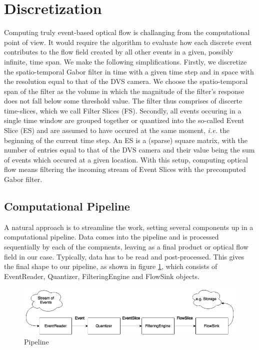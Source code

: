 \section{Discretization}

Computing truly event-based optical flow is challanging from the computational point of view. 
It would require the algorithm to evaluate how each discrete event contributes to the flow field created by all other events in a given, possibly infinite, time span.
We make the following simplifications.
Firstly, we discretize the spatio-temporal Gabor filter in time with a given time step and in space with the resolution equal to that of the DVS camera.
We choose the spatio-temporal span of the filter as the volume in which the magnitude of the filter's response does not fall below some threshold value.
The filter thus comprises of discerte time-slices, which we call Filter Slices (FS).
Secondly, all events occuring in a single time window are grouped together or quantized into the so-called Event Slice (ES) and are assumed to have occured at the same moment, \emph{i.e.} the beginning of the current time step. 
An ES is a (sparse) square matrix, with the number of entries equal to that of the DVS camera and their value being the sum of events which occured at a given location. 
With this setup, computing optical flow means filtering the incoming stream of Event Slices with the precomputed Gabor filter.


\subsection{Computational Pipeline}
A natural approach is to streamline the work, setting several components up in a computational pipeline.
Data comes into the pipeline and is processed sequentially by each of the compnents, leaving as a final product or optical flow field in our case. 
Typically, data has to be read and post-processed.
This gives the final shape to our pipeline, as shown in figure \ref{fig:pipeline}, which consists of EventReader, Quantizer, FilteringEngine and FlowSink objects.

\begin{figure}[ht!]
 \label{fig:pipeline}
 \includegraphics[width=\textwidth]{figs/pipeline}
 \caption{Pipeline}
\end{figure}

